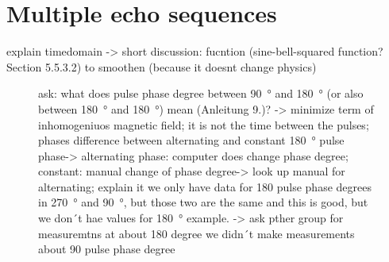 \section{Multiple echo sequences}
\label{sec:Multipleechosequences}

explain timedomain -> short discussion: fucntion (sine-bell-squared function? Section 5.5.3.2) to smoothen (because it doesnt change physics)
%     
\begin{figure}[H]
    \centering
    
    \caption[]{ask: what does pulse phase degree between \SI{90}{\degree} and \SI{180}{\degree} (or also between \SI{180}{\degree} and \SI{180}{\degree}) mean (Anleitung 9.)? -> minimize term of inhomogeniuos magnetic field; it is not the time between the pulses; phases\newline
    difference between alternating and constant \SI{180}{\degree} pulse phase-> alternating phase: computer does change phase degree; constant: manual change of phase degree-> look up manual for alternating; explain it\newline
    we only have data for 180 pulse phase degrees in \SI{270}{\degree} and \SI{90}{\degree}, but those two are the same and this is good, but we don´t hae values for \SI{180}{\degree} example. -> ask pther group for measuremtns at about 180 degree\newline
    we didn´t make measurements about 90 pulse phase degree}
    \label{fig:180pulsephasedegree}
\end{figure}
